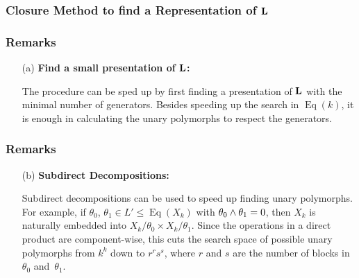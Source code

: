 \documentclass[12 pt]{beamer}
\begin{document}
\begin{frame}[t]
\frametitle{Closure Method to find a Representation of $\mathbf{L}$} 
\begin{itemize}


\end{itemize}

\end{frame}

\begin{frame}[t]
\frametitle{Remarks}

\begin{itemize}

\item[(a)]
\textbf{Find a small presentation of $\mathbf{L}$:}

The procedure can be sped up by first finding a presentation
of $\mathbf{L}$ with the minimal number of generators. Besides speeding
up the search in $\operatorname{Eq}(k)$, it is enough in 
calculating the unary polymorphs to respect the generators.

\end{itemize}
\end{frame}

\begin{frame}[t]
\frametitle{Remarks}

\begin{itemize}

\item[(b)]
\textbf{Subdirect Decompositions:}


Subdirect decompositions can be used to speed up finding unary
polymorphs. For  example, if $\theta_0$, $\theta_1 \in L' \le 
\operatorname{Eq}(X_k)$ with $\theta_0 \meet \theta_1 = 0$, 
then $X_k$ is naturally embedded into 
$X_k/\theta_0 \times X_k/\theta_1$. Since the operations in a
direct product are component-wise, this 
cuts the search space of possible unary polymorphs 
from $k^k$ down to $r^r  s^s$, where $r$ and $s$ are the number 
of blocks in $\theta_0$ and~$\theta_1$.

\end{itemize}
\end{frame}
\end{document}
